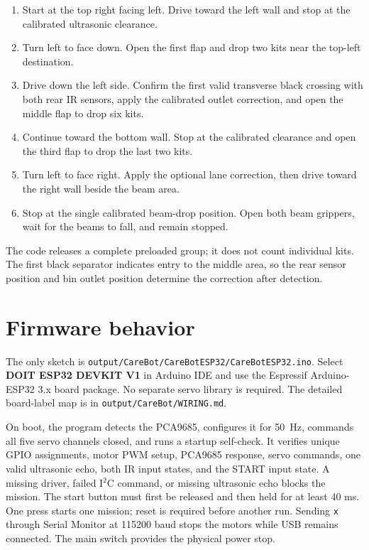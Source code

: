 \documentclass[10pt]{article}
\begin{document}
\begin{enumerate}
  \item Start at the top right facing left. Drive toward the left wall and stop at the calibrated ultrasonic clearance.
  \item Turn left to face down. Open the first flap and drop two kits near the top-left destination.
  \item Drive down the left side. Confirm the first valid transverse black crossing with both rear IR sensors, apply the calibrated outlet correction, and open the middle flap to drop six kits.
  \item Continue toward the bottom wall. Stop at the calibrated clearance and open the third flap to drop the last two kits.
  \item Turn left to face right. Apply the optional lane correction, then drive toward the right wall beside the beam area.
  \item Stop at the single calibrated beam-drop position. Open both beam grippers, wait for the beams to fall, and remain stopped.
\end{enumerate}

The code releases a complete preloaded group; it does not count individual kits. The first black separator indicates entry to the middle area, so the rear sensor position and bin outlet position determine the correction after detection.

\section*{Firmware behavior}

The only sketch is \texttt{output/CareBot/CareBotESP32/CareBotESP32.ino}. Select \textbf{DOIT ESP32 DEVKIT V1} in Arduino IDE and use the Espressif Arduino-ESP32 3.x board package. No separate servo library is required. The detailed board-label map is in \texttt{output/CareBot/WIRING.md}.

On boot, the program detects the PCA9685, configures it for 50~Hz, commands all five servo channels closed, and runs a startup self-check. It verifies unique GPIO assignments, motor PWM setup, PCA9685 response, servo commands, one valid ultrasonic echo, both IR input states, and the START input state. A missing driver, failed I$^2$C command, or missing ultrasonic echo blocks the mission. The start button must first be released and then held for at least 40 ms. One press starts one mission; reset is required before another run. Sending \texttt{x} through Serial Monitor at 115200 baud stops the motors while USB remains connected. The main switch provides the physical power stop.
\end{document}
